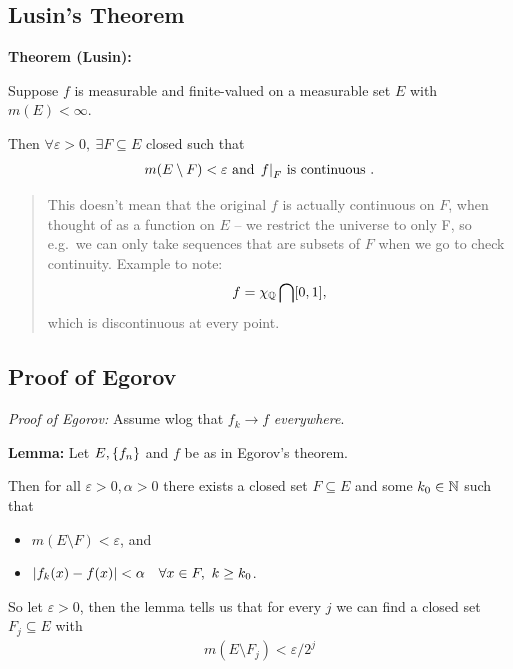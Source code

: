 \hypertarget{lusins-theorem}{%
\subsection{Lusin's Theorem}\label{lusins-theorem}}

\textbf{Theorem (Lusin):}

Suppose \(f\) is measurable and finite-valued on a measurable set \(E\)
with \(m(E) < \infty\).

Then \(\forall \varepsilon > 0,~\exists F \subseteq E\) closed such that
\begin{align*}
m(E\setminus F) < \varepsilon 
\text{ and } 
{\left.{f}\right|_{F}} \text{ is continuous }
.\end{align*}

\begin{quote}
This doesn't mean that the original \(f\) is actually continuous on
\(F\), when thought of as a function on \(E\) -- we restrict the
universe to only F, so e.g.~we can only take sequences that are subsets
of \(F\) when we go to check continuity. Example to note:
\begin{align*}
f = \chi_{\mathbb{Q}} \bigcap [0, 1]
,\end{align*} which is discontinuous at every point.
\end{quote}

\hypertarget{proof-of-egorov}{%
\subsection{Proof of Egorov}\label{proof-of-egorov}}

\emph{Proof of Egorov:} Assume wlog that \(f_k \to f\)
\emph{everywhere}.

\textbf{Lemma:} Let \(E, \left\{{f_n}\right\}\) and \(f\) be as in Egorov's
theorem.

Then for all \(\varepsilon > 0, \alpha > 0\) there exists a closed set
\(F \subseteq E\) and some \(k_0 \in {\mathbb{N}}\) such that

\begin{itemize}
\item
  \(m(E\setminus F) < \varepsilon\), and
\item
  \({\left\lvert {f_k(x) - f(x)} \right\rvert} < \alpha\quad \forall x\in F,~ k \geq k_0\).
\end{itemize}

So let \(\varepsilon > 0\), then the lemma tells us that for every \(j\)
we can find a closed set \(F_j \subseteq E\) with
\begin{align*}
m(E\setminus F_j) < \varepsilon / 2^j
\end{align*}

